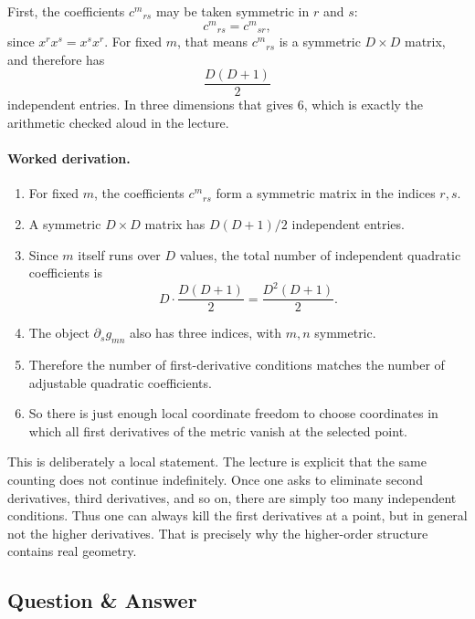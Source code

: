 First, the coefficients \(c^{m}{}_{rs}\) may be taken symmetric in \(r\) and \(s\):
\begin{equation}
c^{m}{}_{rs}=c^{m}{}_{sr},
\end{equation}
since \(x^{r}x^{s}=x^{s}x^{r}\). For fixed \(m\), that means \(c^{m}{}_{rs}\) is a symmetric \(D\times D\) matrix, and therefore has
\begin{equation}
\frac{D(D+1)}{2}
\end{equation}
independent entries. In three dimensions that gives \(6\), which is exactly the arithmetic checked aloud in the lecture.

\paragraph{Worked derivation.}
\begin{enumerate}
\item For fixed \(m\), the coefficients \(c^{m}{}_{rs}\) form a symmetric matrix in the indices \(r,s\).
\item A symmetric \(D\times D\) matrix has \(D(D+1)/2\) independent entries.
\item Since \(m\) itself runs over \(D\) values, the total number of independent quadratic coefficients is
\begin{equation}
D\cdot \frac{D(D+1)}{2}=\frac{D^{2}(D+1)}{2}.
\end{equation}
\item The object \(\partial_{s}g_{mn}\) also has three indices, with \(m,n\) symmetric.
\item Therefore the number of first-derivative conditions matches the number of adjustable quadratic coefficients.
\item So there is just enough local coordinate freedom to choose coordinates in which all first derivatives of the metric vanish at the selected point.
\end{enumerate}

This is deliberately a local statement. The lecture is explicit that the same counting does not continue indefinitely. Once one asks to eliminate second derivatives, third derivatives, and so on, there are simply too many independent conditions. Thus one can always kill the first derivatives at a point, but in general not the higher derivatives. That is precisely why the higher-order structure contains real geometry.

\subsection{Question \& Answer}

